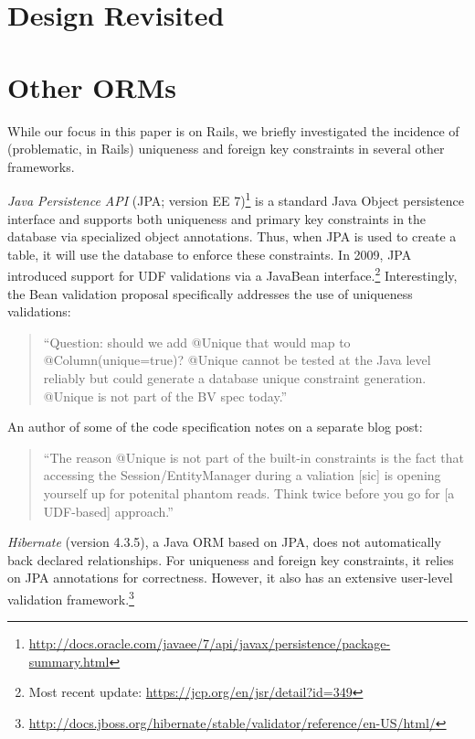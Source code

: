 
\section{Design Revisited}
\label{sec:discussion}


\section{Other ORMs}

While our focus in this paper is on Rails, we briefly investigated the
incidence of (problematic, in Rails) uniqueness and foreign key
constraints in several other frameworks.

\newcommand{\orm}[1]{{\vspace{.45em}\noindent\textit{#1}}}

\orm{Java Persistence API}
(JPA; version EE 7)\footnote{\url{http://docs.oracle.com/javaee/7/api/javax/persistence/package-summary.html}}
is a standard Java Object persistence interface and supports both
uniqueness and primary key constraints in the database via specialized
object annotations. Thus, when JPA is used to create a table, it will
use the database to enforce these constraints. In 2009, JPA introduced
support for UDF validations via a JavaBean interface.\footnote{Most
  recent update: \url{https://jcp.org/en/jsr/detail?id=349}} Interestingly,
the Bean validation proposal specifically addresses the use of
uniqueness validations:
\begin{quote}
``Question: should we add @Unique that would map to @Column(unique=true)?
@Unique cannot be tested at the Java level reliably but could generate
a database unique constraint generation. @Unique is not part
of the BV spec today.''~\cite{jsr-bean}
\end{quote}
An author of some of the code specification notes on a separate blog
post:
\begin{quote}
  ``The reason @Unique is not part of the built-in constraints is the
  fact that accessing the Session/EntityManager during a valiation
  [sic] is opening yourself up for potenital phantom reads. Think
  twice before you go for [a UDF-based] approach.''~\cite{unique-bean}
\end{quote}

\orm{Hibernate} (version 4.3.5), a Java ORM based on JPA, does
not automatically back declared relationships. For uniqueness and
foreign key constraints, it relies on JPA annotations for
correctness. However, it also has an extensive user-level validation
framework.\footnote{\url{http://docs.jboss.org/hibernate/stable/validator/reference/en-US/html/}}


